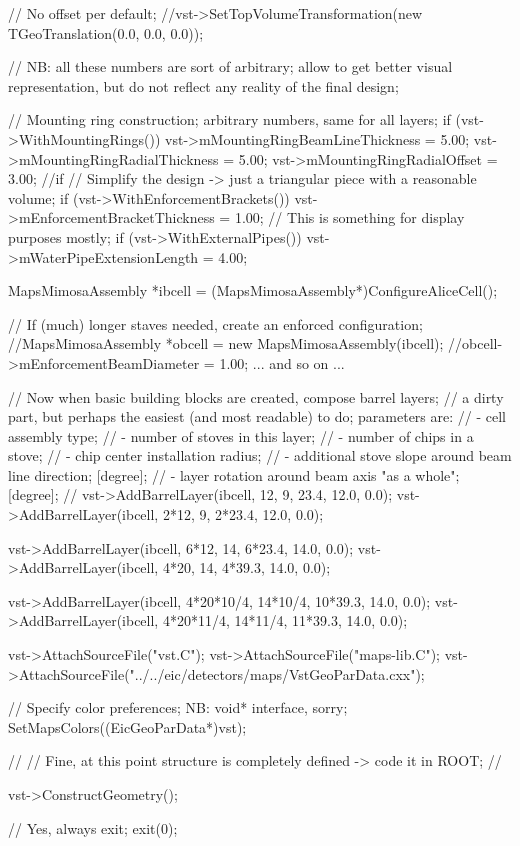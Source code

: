 \documentclass[12pt]{article}
\begin{document}
\begin{tcolorbox}
\begin{verbnobox}[\tiny]
{  // No offset per default;
  //vst->SetTopVolumeTransformation(new TGeoTranslation(0.0, 0.0, 0.0));

  // NB: all these numbers are sort of arbitrary; allow to get better visual representation, but do not reflect any reality of the final design;

  // Mounting ring construction; arbitrary numbers, same for all layers;
  if (vst->WithMountingRings()) {
    vst->mMountingRingBeamLineThickness =    5.00;
    vst->mMountingRingRadialThickness   =    5.00;
    vst->mMountingRingRadialOffset      =    3.00;
  } //if
  // Simplify the design -> just a triangular piece with a reasonable volume; 
  if (vst->WithEnforcementBrackets())
    vst->mEnforcementBracketThickness   =    1.00;
  // This is something for display purposes mostly;
  if (vst->WithExternalPipes())
    vst->mWaterPipeExtensionLength      =    4.00;

  MapsMimosaAssembly *ibcell = (MapsMimosaAssembly*)ConfigureAliceCell();

  // If (much) longer staves needed, create an enforced configuration;
  //MapsMimosaAssembly *obcell = new MapsMimosaAssembly(ibcell);
  //obcell->mEnforcementBeamDiameter     =    1.00; ... and so on ...

  // Now when basic building blocks are created, compose barrel layers;
  // a dirty part, but perhaps the easiest (and most readable) to do; parameters are:
  //  - cell assembly type;
  //  - number of stoves in this layer;
  //  - number of chips in a stove;
  //  - chip center installation radius;
  //  - additional stove slope around beam line direction; [degree];
  //  - layer rotation around beam axis "as a whole"; [degree];
  //
  vst->AddBarrelLayer(ibcell,   12,  9,   23.4, 12.0, 0.0);
  vst->AddBarrelLayer(ibcell, 2*12,  9, 2*23.4, 12.0, 0.0);

  vst->AddBarrelLayer(ibcell, 6*12, 14, 6*23.4, 14.0, 0.0);
  vst->AddBarrelLayer(ibcell, 4*20, 14, 4*39.3, 14.0, 0.0);

  vst->AddBarrelLayer(ibcell, 4*20*10/4, 14*10/4, 10*39.3, 14.0, 0.0);
  vst->AddBarrelLayer(ibcell, 4*20*11/4, 14*11/4, 11*39.3, 14.0, 0.0);

  vst->AttachSourceFile("vst.C");
  vst->AttachSourceFile("maps-lib.C");
  vst->AttachSourceFile("../../eic/detectors/maps/VstGeoParData.cxx");

  // Specify color preferences; NB: void* interface, sorry;
  SetMapsColors((EicGeoParData*)vst);

  //
  // Fine, at this point structure is completely defined -> code it in ROOT;
  //

  vst->ConstructGeometry();

  // Yes, always exit;
  exit(0);
}
\end{verbnobox}  
\end{tcolorbox}
\end{document}
